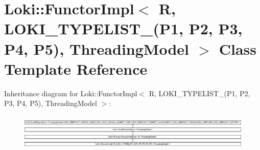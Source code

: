 \hypertarget{classLoki_1_1FunctorImpl_3_01R_00_01LOKI__TYPELIST__5_07P1_00_01P2_00_01P3_00_01P4_00_01P5_08_00_01ThreadingModel_01_4}{}\section{Loki\+:\+:Functor\+Impl$<$ R, L\+O\+K\+I\+\_\+\+T\+Y\+P\+E\+L\+I\+S\+T\+\_(P1, P2, P3, P4, P5), Threading\+Model $>$ Class Template Reference}
\label{classLoki_1_1FunctorImpl_3_01R_00_01LOKI__TYPELIST__5_07P1_00_01P2_00_01P3_00_01P4_00_01P5_08_00_01ThreadingModel_01_4}
Inheritance diagram for Loki\+:\+:Functor\+Impl$<$ R, L\+O\+K\+I\+\_\+\+T\+Y\+P\+E\+L\+I\+S\+T\+\_(P1, P2, P3, P4, P5), Threading\+Model $>$\+:\begin{figure}[H]
\begin{center}
\leavevmode
\includegraphics[height=1.751368cm]{classLoki_1_1FunctorImpl_3_01R_00_01LOKI__TYPELIST__5_07P1_00_01P2_00_01P3_00_01P4_00_01P5_08_00_01ThreadingModel_01_4}
\end{center}
\end{figure}
